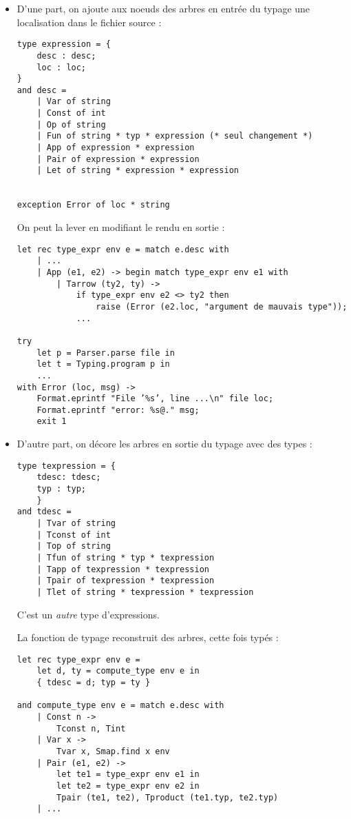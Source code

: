 \documentclass{cours}
\begin{document}
\begin{itemize}
    \item D'une part, on ajoute aux noeuds des arbres en entrée du typage une localisation dans le fichier source : 
\begin{verbatim}
type expression = {
    desc : desc;
    loc : loc;
}
and desc = 
    | Var of string
    | Const of int
    | Op of string
    | Fun of string * typ * expression (* seul changement *)
    | App of expression * expression
    | Pair of expression * expression
    | Let of string * expression * expression


exception Error of loc * string
\end{verbatim}
On peut la lever en modifiant le rendu en sortie : 
\begin{verbatim}
let rec type_expr env e = match e.desc with
    | ...
    | App (e1, e2) -> begin match type_expr env e1 with
        | Tarrow (ty2, ty) ->
            if type_expr env e2 <> ty2 then
                raise (Error (e2.loc, "argument de mauvais type"));
            ...

try
    let p = Parser.parse file in
    let t = Typing.program p in
    ...
with Error (loc, msg) ->
    Format.eprintf "File ’%s’, line ...\n" file loc;
    Format.eprintf "error: %s@." msg;
    exit 1
\end{verbatim}

\item D'autre part, on décore les arbres en sortie du typage avec des types :
\begin{verbatim}
type texpression = {
    tdesc: tdesc;
    typ : typ;
    }
and tdesc =
    | Tvar of string
    | Tconst of int
    | Top of string
    | Tfun of string * typ * texpression
    | Tapp of texpression * texpression
    | Tpair of texpression * texpression
    | Tlet of string * texpression * texpression
\end{verbatim}
C'est un \emph{autre} type d'expressions.

La fonction de typage reconstruit des arbres, cette fois typés : 
\begin{verbatim}
let rec type_expr env e =
    let d, ty = compute_type env e in
    { tdesc = d; typ = ty }
    
and compute_type env e = match e.desc with
    | Const n ->
        Tconst n, Tint
    | Var x ->
        Tvar x, Smap.find x env
    | Pair (e1, e2) ->
        let te1 = type_expr env e1 in
        let te2 = type_expr env e2 in
        Tpair (te1, te2), Tproduct (te1.typ, te2.typ)
    | ...
\end{verbatim}
\end{itemize}
\end{document}
